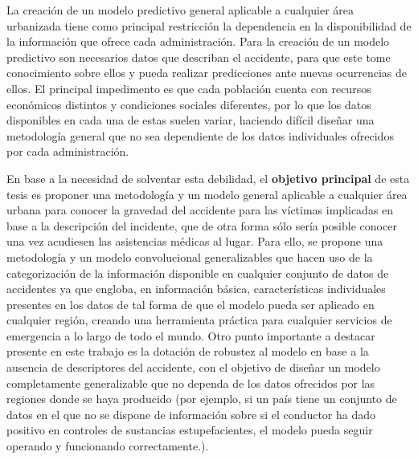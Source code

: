 \documentclass{uathesis-es}
\begin{document}
	
	La creación de un modelo predictivo general aplicable a cualquier área urbanizada tiene como principal restricción la dependencia en la disponibilidad de la información que ofrece cada administración. Para la creación de un modelo predictivo son necesarios datos que describan el accidente, para que este tome conocimiento sobre ellos y pueda realizar predicciones ante nuevas ocurrencias de ellos. El principal impedimento es que cada población cuenta con recursos económicos distintos y condiciones sociales diferentes, por lo que los datos disponibles en cada una de estas suelen variar, haciendo difícil diseñar una metodología general que no sea dependiente de los datos individuales ofrecidos por cada administración.
	
	En base a la necesidad de solventar esta debilidad, el \textbf{objetivo principal} de esta tesis es proponer una metodología y un modelo general aplicable a cualquier área urbana para conocer la gravedad del accidente para las víctimas implicadas en base a la descripción del incidente, que de otra forma sólo sería posible conocer una vez acudiesen las asistencias médicas al lugar. Para ello, se propone una metodología y un modelo convolucional generalizables que hacen uso de la categorización de la información disponible en cualquier conjunto de datos de accidentes ya que engloba, en información básica, características individuales presentes en los datos de tal forma de que el modelo pueda ser aplicado en cualquier región, creando una herramienta práctica para cualquier servicios de emergencia a lo largo de todo el mundo.
	Otro punto importante a destacar presente en este trabajo es la dotación de robustez al modelo en base a la ausencia de descriptores del accidente, con el objetivo de diseñar un modelo completamente generalizable que no dependa de los datos ofrecidos por las regiones donde se haya producido (por ejemplo, si un país tiene un conjunto de datos en el que no se dispone de información sobre si el conductor ha dado positivo en controles de sustancias estupefacientes, el modelo pueda seguir operando y funcionando correctamente.).
	
	
	
\end{document}

